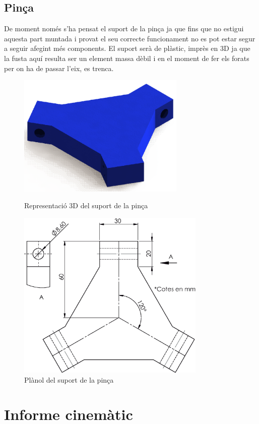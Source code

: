 \documentclass[a4paper, 12pt]{article}
\begin{document}
\subsection{Pinça}
De moment només s'ha pensat el suport de la pinça ja que fins que no estigui aquesta part muntada i provat el seu correcte funcionament no es pot estar segur a seguir afegint més components. 
El suport serà de plàstic, imprès en 3D ja que la fusta aquí resulta ser un element massa dèbil i en el moment de fer els forats per on ha de passar l'eix, es trenca.
\begin{figure}[h!]
\centering
\begin{minipage}[b]{0.45\linewidth}
\centering
\includegraphics[width=8cm]{./imgComp/pinca}
\caption{Representació 3D del suport de la pinça}
\end{minipage}
\hfill
\begin{minipage}[b]{0.45\linewidth}
\centering
\includegraphics[width=9cm]{./sketch/pinca}
\caption{Plànol del suport de la pinça}
\end{minipage}
\end{figure}

\newpage
\section{Informe cinemàtic}
\end{document}
